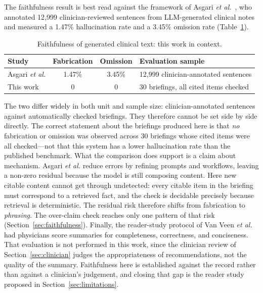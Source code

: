 The faithfulness result is best read against the framework of Asgari
\textit{et al.}~\cite{asgari2025}, who annotated 12{,}999 clinician-reviewed
sentences from LLM-generated clinical notes and measured a 1.47\%
hallucination rate and a 3.45\% omission rate
(Table~\ref{tab:faithful-compare}).

\begin{table}[h]
\centering
\caption{Faithfulness of generated clinical text: this work in context.}
\label{tab:faithful-compare}
\footnotesize
\begin{tabular}{lccl}
\hline
\textbf{Study} & \textbf{Fabrication} & \textbf{Omission} & \textbf{Evaluation sample} \\
\hline
Asgari \textit{et al.} \cite{asgari2025}
  & 1.47\% & 3.45\%
  & 12{,}999 clinician-annotated sentences \\
This work
  & 0 & 0
  & 30 briefings, all cited items checked \\
\hline
\end{tabular}

\vspace{2pt}
\end{table}

The two differ widely in both unit and sample size: clinician-annotated sentences against
automatically checked briefings. They therefore cannot be set side by side directly. The
correct statement about the briefings produced here is that \emph{no} fabrication or omission
was observed across 30 briefings whose cited items were all checked---not that this system
has a lower hallucination rate than the published benchmark. What the comparison does support is a claim about mechanism. Asgari
\textit{et al.} reduce errors by refining prompts and workflows, leaving a non-zero residual
because the model is still composing content. Here new citable content cannot get through
undetected: every citable item in the briefing must correspond to a retrieved fact, and the
check is decidable precisely because retrieval is deterministic. The residual risk therefore
shifts from fabrication to \emph{phrasing}. The over-claim check reaches only one pattern of
that risk (Section~\ref{sec:faithfulness}). Finally, the reader-study protocol of Van Veen \textit{et al.}~\cite{vanveen2023} had
physicians score summaries for completeness, correctness, and conciseness. That evaluation
is not performed in this work, since the clinician review of Section~\ref{sec:clinician}
judges the appropriateness of recommendations, not the quality of the summary. Faithfulness here is established against the record rather
than against a clinician's judgement, and closing that gap is the reader study proposed in
Section~\ref{sec:limitations}.


